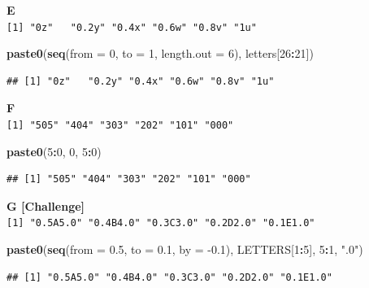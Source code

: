 \documentclass[]{book}
\newenvironment{Shaded}{\begin{snugshade}}{\end{snugshade}}
\newcommand{\DataTypeTok}[1]{\textcolor[rgb]{0.13,0.29,0.53}{#1}}
\newcommand{\DecValTok}[1]{\textcolor[rgb]{0.00,0.00,0.81}{#1}}
\newcommand{\FloatTok}[1]{\textcolor[rgb]{0.00,0.00,0.81}{#1}}
\newcommand{\KeywordTok}[1]{\textcolor[rgb]{0.13,0.29,0.53}{\textbf{#1}}}
\newcommand{\NormalTok}[1]{#1}
\newcommand{\OperatorTok}[1]{\textcolor[rgb]{0.81,0.36,0.00}{\textbf{#1}}}
\newcommand{\StringTok}[1]{\textcolor[rgb]{0.31,0.60,0.02}{#1}}
\begin{document}
\textbf{E}\\
\texttt{{[}1{]}\ "0z"\ \ \ "0.2y"\ "0.4x"\ "0.6w"\ "0.8v"\ "1u"}

\begin{Shaded}
\begin{Highlighting}[]
\KeywordTok{paste0}\NormalTok{(}\KeywordTok{seq}\NormalTok{(}\DataTypeTok{from =} \DecValTok{0}\NormalTok{, }\DataTypeTok{to =} \DecValTok{1}\NormalTok{, }\DataTypeTok{length.out =} \DecValTok{6}\NormalTok{), letters[}\DecValTok{26}\OperatorTok{:}\DecValTok{21}\NormalTok{])}
\end{Highlighting}
\end{Shaded}

\begin{verbatim}
## [1] "0z"   "0.2y" "0.4x" "0.6w" "0.8v" "1u"
\end{verbatim}

\textbf{F}\\
\texttt{{[}1{]}\ "505"\ "404"\ "303"\ "202"\ "101"\ "000"}

\begin{Shaded}
\begin{Highlighting}[]
\KeywordTok{paste0}\NormalTok{(}\DecValTok{5}\OperatorTok{:}\DecValTok{0}\NormalTok{, }\DecValTok{0}\NormalTok{, }\DecValTok{5}\OperatorTok{:}\DecValTok{0}\NormalTok{)}
\end{Highlighting}
\end{Shaded}

\begin{verbatim}
## [1] "505" "404" "303" "202" "101" "000"
\end{verbatim}

\textbf{G {[}Challenge{]}}\\
\texttt{{[}1{]}\ "0.5A5.0"\ "0.4B4.0"\ "0.3C3.0"\ "0.2D2.0"\ "0.1E1.0"}

\begin{Shaded}
\begin{Highlighting}[]
\KeywordTok{paste0}\NormalTok{(}\KeywordTok{seq}\NormalTok{(}\DataTypeTok{from =} \FloatTok{0.5}\NormalTok{, }\DataTypeTok{to =} \FloatTok{0.1}\NormalTok{, }\DataTypeTok{by =} \FloatTok{-0.1}\NormalTok{),  LETTERS[}\DecValTok{1}\OperatorTok{:}\DecValTok{5}\NormalTok{], }\DecValTok{5}\OperatorTok{:}\DecValTok{1}\NormalTok{, }\StringTok{".0"}\NormalTok{)}
\end{Highlighting}
\end{Shaded}

\begin{verbatim}
## [1] "0.5A5.0" "0.4B4.0" "0.3C3.0" "0.2D2.0" "0.1E1.0"
\end{verbatim}
\end{document}
